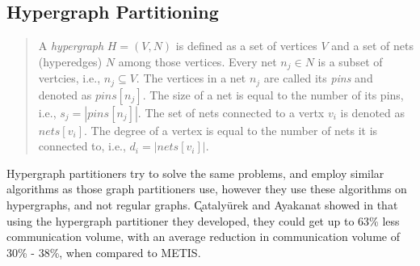 \subsection{Hypergraph Partitioning}
\begin{quote}
    A \emph{hypergraph} \(H = (V,N)\) is defined as a set of vertices \(V\) and a set of nets (hyperedges) \(N\) among those vertices. Every net \(n_{j} \in N\) is a subset of vertcies, i.e., \(n_{j} \subseteq V\). The vertices in a net \(n_{j}\) are called its \textit{pins} and denoted as \(pins[n_{j}]\). The size of a net is equal to the number of its pins, i.e., \(s_{j} = \left|  pins[n_{j}] \right|\). The set of nets connected to a vertx \(v_{i}\) is denoted as \(nets[v_{i}]\). The degree of a vertex is equal to the number of nets it is connected to, i.e., \(d_{i} = \left| nets[v_{i}] \right|\).
\end{quote}

\begin{flushright}
    \cite{hypergraphpartitioning}
\end{flushright}
\medskip
Hypergraph partitioners try to solve the same problems, and employ similar algorithms as those graph partitioners use, however they use these algorithms on hypergraphs, and not regular graphs. \k Cataly\" urek and Ayakanat showed in \cite{hypergraphpartitioning} that using the hypergraph partitioner they developed, they could get up to 63\% less communication volume, with an average reduction in communication volume of 30\% - 38\%, when compared to METIS.


